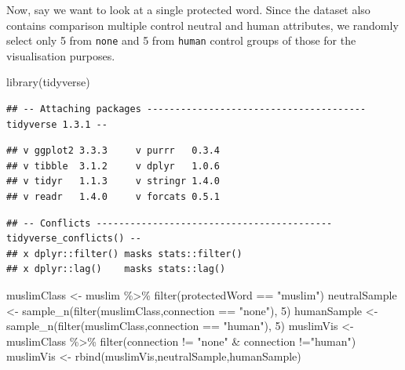 \documentclass[
  12pt,
]{book}
\newenvironment{Shaded}{\begin{snugshade}}{\end{snugshade}}
\newcommand{\DecValTok}[1]{\textcolor[rgb]{0.00,0.00,0.81}{#1}}
\newcommand{\FunctionTok}[1]{\textcolor[rgb]{0.00,0.00,0.00}{#1}}
\newcommand{\NormalTok}[1]{#1}
\newcommand{\OtherTok}[1]{\textcolor[rgb]{0.56,0.35,0.01}{#1}}
\newcommand{\SpecialCharTok}[1]{\textcolor[rgb]{0.00,0.00,0.00}{#1}}
\newcommand{\StringTok}[1]{\textcolor[rgb]{0.31,0.60,0.02}{#1}}
\begin{document}
Now, say we want to look at a single protected word. Since the dataset also contains comparison multiple control neutral and human attributes, we randomly select only 5 from \texttt{none} and 5 from \texttt{human} control groups of those for the visualisation purposes.

\vspace{1mm}
\footnotesize

\begin{Shaded}
\begin{Highlighting}[]
\FunctionTok{library}\NormalTok{(tidyverse)}
\end{Highlighting}
\end{Shaded}

\begin{verbatim}
## -- Attaching packages --------------------------------------- tidyverse 1.3.1 --
\end{verbatim}

\begin{verbatim}
## v ggplot2 3.3.3     v purrr   0.3.4
## v tibble  3.1.2     v dplyr   1.0.6
## v tidyr   1.1.3     v stringr 1.4.0
## v readr   1.4.0     v forcats 0.5.1
\end{verbatim}

\begin{verbatim}
## -- Conflicts ------------------------------------------ tidyverse_conflicts() --
## x dplyr::filter() masks stats::filter()
## x dplyr::lag()    masks stats::lag()
\end{verbatim}

\begin{Shaded}
\begin{Highlighting}[]
\NormalTok{muslimClass }\OtherTok{\textless{}{-}}\NormalTok{ muslim }\SpecialCharTok{\%\textgreater{}\%} \FunctionTok{filter}\NormalTok{(protectedWord }\SpecialCharTok{==} \StringTok{"muslim"}\NormalTok{)}
\NormalTok{neutralSample }\OtherTok{\textless{}{-}} \FunctionTok{sample\_n}\NormalTok{(}\FunctionTok{filter}\NormalTok{(muslimClass,connection }\SpecialCharTok{==} \StringTok{"none"}\NormalTok{), }\DecValTok{5}\NormalTok{)}
\NormalTok{humanSample }\OtherTok{\textless{}{-}} \FunctionTok{sample\_n}\NormalTok{(}\FunctionTok{filter}\NormalTok{(muslimClass,connection }\SpecialCharTok{==} \StringTok{"human"}\NormalTok{), }\DecValTok{5}\NormalTok{)}
\NormalTok{muslimVis }\OtherTok{\textless{}{-}}\NormalTok{ muslimClass }\SpecialCharTok{\%\textgreater{}\%} \FunctionTok{filter}\NormalTok{(connection }\SpecialCharTok{!=} \StringTok{"none"} \SpecialCharTok{\&}\NormalTok{ connection }\SpecialCharTok{!=}\StringTok{"human"}\NormalTok{)}
\NormalTok{muslimVis }\OtherTok{\textless{}{-}} \FunctionTok{rbind}\NormalTok{(muslimVis,neutralSample,humanSample)}
\end{Highlighting}
\end{Shaded}
\end{document}

